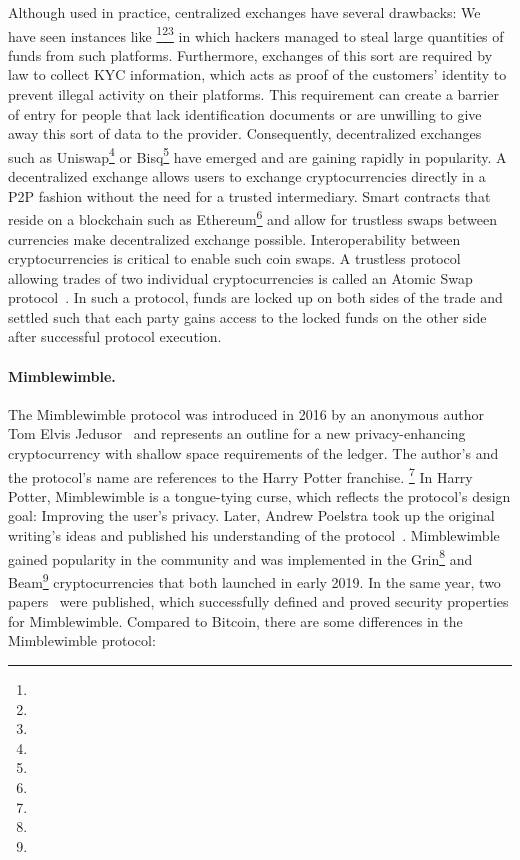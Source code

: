 Although used in practice, centralized exchanges have several drawbacks:
We have seen instances like \footnote{\urlmtgox}\footnote{\urlbitgrail}\footnote{\urlquadriga} in which hackers managed to steal large quantities of funds from such platforms.
Furthermore, exchanges of this sort are required by law to collect KYC information, which acts as proof of the customers' identity to prevent illegal activity on their platforms.
This requirement can create a barrier of entry for people that lack identification documents or are unwilling to give away this sort of data to the provider.
Consequently, decentralized exchanges such as Uniswap\footnote{\urluniswp} or Bisq\footnote{\urlbisq} have emerged and are gaining rapidly in popularity.
A decentralized exchange allows users to exchange cryptocurrencies directly in a P2P fashion without the need for a trusted intermediary.
Smart contracts that reside on a blockchain such as Ethereum\footnote{\urlethereum} and allow for trustless swaps between currencies make decentralized exchange possible.
Interoperability between cryptocurrencies is critical to enable such coin swaps.
A trustless protocol allowing trades of two individual cryptocurrencies is called an Atomic Swap protocol~\cite{herlihy2018atomic}.
In such a protocol, funds are locked up on both sides of the trade and settled such that each party gains access to the locked funds on the other side after successful protocol execution.

\paragraph{Mimblewimble.} The Mimblewimble protocol was introduced in 2016 by an anonymous author Tom Elvis Jedusor~\cite{jedusor2016mimblewimble} and represents an outline for a new privacy-enhancing cryptocurrency with shallow space requirements of the ledger.
The author’s and the protocol's name are references to the Harry Potter franchise. \footnote{\urlharrypotter}
In Harry Potter, Mimblewimble is a tongue-tying curse, which reflects the protocol's design goal: Improving the user's privacy.
Later, Andrew Poelstra took up the original writing's ideas and published his understanding of the protocol~\cite{poelstra2016mimblewimble}.
Mimblewimble gained popularity in the community and was implemented in the Grin\footnote{\urlgrin} and Beam\footnote{\urlbeam} cryptocurrencies that both launched in early 2019.
In the same year, two papers~\cite{fuchsbauer2019aggregate,betarte2019towards} were published, which successfully defined and proved security properties for Mimblewimble.
Compared to Bitcoin, there are some differences in the Mimblewimble protocol:

